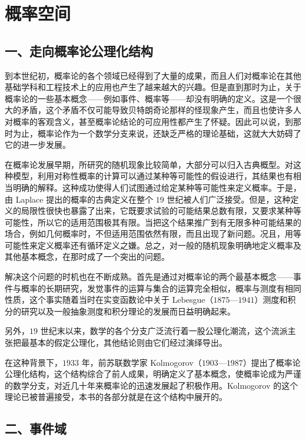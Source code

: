 \documentclass[../../main.tex]{subfiles}
\begin{document}
\section{概率空间}\label{section:ch01-概率空间}

\subsection*{一、走向概率论公理化结构}

到本世纪初，概率论的各个领域已经得到了大量的成果，而且人们对概率论在其他基础学科和工程技术上的应用也产生了越来越大的兴趣。但是直到那时为止，关于概率论的一些基本概念——例如事件、概率等——却没有明确的定义。这是一个很大的矛盾，这个矛盾不仅可能导致贝特朗奇论那样的怪现象产生，而且也使许多人对概率的客观含义，甚至概率论结论的可应用性都产生了怀疑。因此可以说，到那时为止，概率论作为一个数学分支来说，还缺乏严格的理论基础，这就大大妨碍了它的进一步发展。

在概率论发展早期，所研究的随机现象比较简单，大部分可以归入古典概型。对这种模型，利用对称性概率的计算可以通过某种等可能性的假设进行，其结果也有相当明确的解释。这种成功使得人们试图通过给定某种等可能性来定义概率。于是，由 Laplace 提出的概率的古典定义在整个 $19$ 世纪被人们广泛接受。但是，这种定义的局限性很快也暴露了出来，它既要求试验的可能结果总数有限，又要求某种等可能性，所以它的适用范围极其有限。当把这个结果推广到有无限多种可能结果的场合，例如几何概率时，不但适用范围依然有限，而且出现了新问题。况且，用等可能性来定义概率还有循环定义之嫌。总之，对一般的随机现象明确地定义概率及其他基本概念，在那时成了一个突出的问题。

解决这个问题的时机也在不断成熟。首先是通过对概率论的两个最基本概念——事件与概率的长期研究，发觉事件的运算与集合的运算完全相似，概率与测度有相同性质，这个事实随着当时在实变函数论中关于 Lebesgue（$1875$—$1941$）测度和积分的研究以及一般抽象测度和积分理论的发展而日益明确起来。

另外，$19$ 世纪末以来，数学的各个分支广泛流行着一股公理化潮流，这个流派主张把最基本的假定公理化，其他结论则由它们经过演绎导出。

在这种背景下，$1933$ 年，前苏联数学家 Kolmogorov（$1903$—$1987$）提出了概率论公理化结构，这个结构综合了前人成果，明确定义了基本概念，使概率论成为严谨的数学分支，对近几十年来概率论的迅速发展起了积极作用。Kolmogorov 的这个理论已被普遍接受，本书的各部分就是在这个结构中展开的。

\subsection*{二、事件域}
\end{document}
